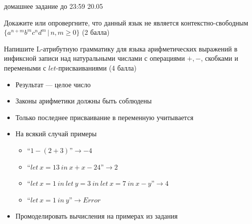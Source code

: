 \documentclass[12pt]{article}
\begin{document}

{\Large домашнее задание до 23:59 20.05}
\bigskip

\begin{enumerate}
{
  \item Докажите или опровергните, что данный язык не является контекстно-свободным $\{ a^{n+m} b^m c^n d^m \, | \, n, m \geq 0 \}$ (2 балла)
  \item {Напишите L-атрибутную грамматику для языка арифметических выражений в инфиксной записи над натуральными числами с операциями $+, -$, скобками и перемеными с $let$-присваиваниями (4 балла)
  \begin{itemize}
      \item Результат --- целое число
      \item Законы арифметики должны быть соблюдены
      \item Только последнее присваивание в переменную учитывается
      \item На всякий случай примеры
      \begin{itemize}
          \item ``$1-(2+3)$''$ \rightarrow -4$
          \item ``$let \ x = 13 \ in \ x + x - 24$''$ \rightarrow 2$
          \item ``$let \ x = 1 \ in \ let \ y = 3 \ in \ let \ x = 7 \ in \ x - y$''$ \rightarrow 4$
          \item ``$let \ x = 1 \ in \ y $''$ \rightarrow Error $
      \end{itemize}
      \item Промоделировать вычисления на примерах из задания
  \end{itemize}
  }
}
\end{enumerate}

 
\end{document}
